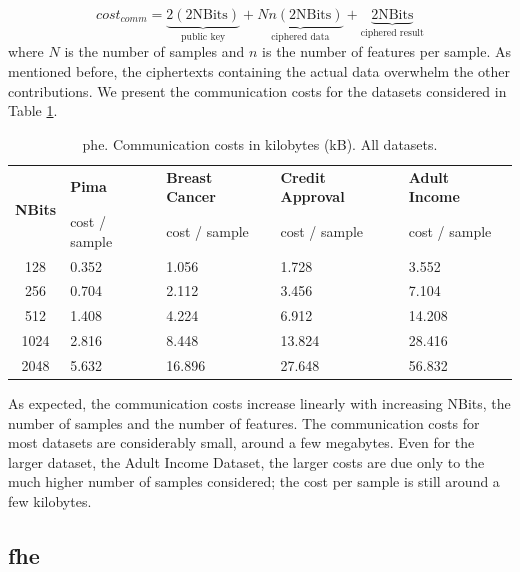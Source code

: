\begin{equation}
\label{eq:PHE_commCost}
cost_{comm} = \underbrace{2(2\text{NBits})}_{\text{public key}} + \underbrace{Nn(2\text{NBits})}_{\text{ciphered data}} + \underbrace{2\text{NBits}}_{\text{ciphered result}} 
\end{equation}
where $N$ is the number of samples and $n$ is the number of features per sample. As mentioned before, the ciphertexts containing the actual data overwhelm the other contributions. We present the communication costs for the datasets considered in Table \ref{table:PHECommCost}.

\begin{table}[htp]
\centering
\caption{\acs{phe}. Communication costs in kilobytes (kB). All datasets.}
\label{table:PHECommCost}
\begin{tabular}{|c|l|l|l|l|}
\hline
\multirow{2}{*}{\textbf{NBits}} & \textbf{Pima}          & \textbf{Breast Cancer} & \textbf{Credit Approval} & \textbf{Adult Income}   \\ \cline{2-5}
                       & cost / sample & cost / sample & cost / sample   & cost / sample  \\ \hline
128       & 0.352        & 1.056          & 1.728          & 3.552         \\ \hline
256       & 0.704        & 2.112          & 3.456          & 7.104         \\ \hline
512       & 1.408        & 4.224          & 6.912          & 14.208        \\ \hline
1024      & 2.816        & 8.448          & 13.824         & 28.416        \\ \hline
2048      & 5.632        & 16.896         & 27.648         & 56.832        \\ \hline
\end{tabular}
\end{table}


As expected, the communication costs increase linearly with increasing NBits, the number of samples and the number of features. The communication costs for most datasets are considerably small, around a few megabytes. Even for the larger dataset, the Adult Income Dataset, the larger costs are due only to the much higher number of samples considered; the cost per sample is still around a few kilobytes.



\subsection{\acl{fhe}}
\label{ssec:comm_fhe}

